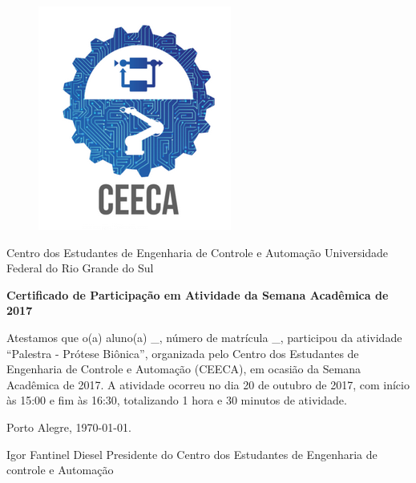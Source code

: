 \documentclass[16pt]{article}
\begin{document}
\begin{landscape}
\centering
\begin{figure}
\centering
\includegraphics[width=0.2\linewidth]{logo.png}
\end{figure}
Centro dos Estudantes de Engenharia de Controle e Automação
Universidade Federal do Rio Grande do Sul


\textbf{Certificado de Participação em Atividade da Semana Acadêmica de 2017}

\justify
Atestamos que o(a) aluno(a) \_, número de matrícula \_, participou da atividade “Palestra - Prótese Biônica”, organizada pelo Centro dos Estudantes de Engenharia de Controle e Automação (CEECA), em ocasião da Semana Acadêmica de 2017. A atividade ocorreu no dia 20 de outubro de 2017, com início às 15:00 e fim às 16:30, totalizando 1 hora e 30 minutos de atividade.

\centering
Porto Alegre, \today.


Igor Fantinel Diesel
Presidente do Centro dos Estudantes de Engenharia de controle e Automação
\end{landscape}
\end{document}
